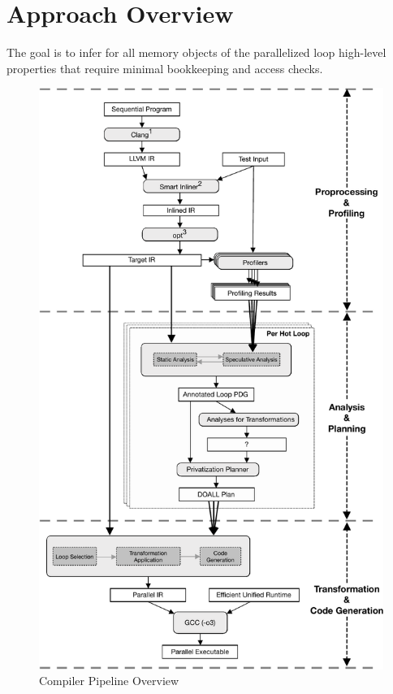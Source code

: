 \section{Approach Overview}
\label{sec:overview}

The goal is to infer for all memory objects of the parallelized loop high-level
properties that require minimal bookkeeping and access checks.

\begin{figure}[htp]
  \includegraphics[width=\columnwidth]{figures/compiler-pipeline-crop}
  \caption{Compiler Pipeline Overview}
  \label{fig:compiler-pipeline}
\end{figure}


